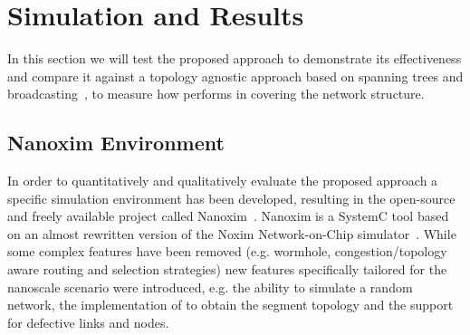 
\section{Simulation and Results}
\label{sec:simulation}

In this section we will test the proposed \disr{} approach to demonstrate
its effectiveness and compare it against a topology agnostic approach
based on spanning trees and
broadcasting~\cite{Patwardhan05evaluatingthe}, to measure how \disr{}
performs in covering the network structure.


\subsection{Nanoxim Environment}

In order to quantitatively and qualitatively evaluate the proposed approach a
specific simulation environment has been developed, resulting in
the open-source and freely available project called
Nanoxim~\cite{nanoxim}.
Nanoxim is a SystemC tool based on an almost rewritten
version of the Noxim Network-on-Chip simulator~\cite{noxim}. While some
complex features have been removed (e.g. wormhole, congestion/topology
aware routing and selection strategies) new features specifically
tailored for the nanoscale scenario were introduced, e.g. the ability to simulate a random
network, the implementation of \disr{} to obtain the segment topology
and the support for defective links and nodes.

